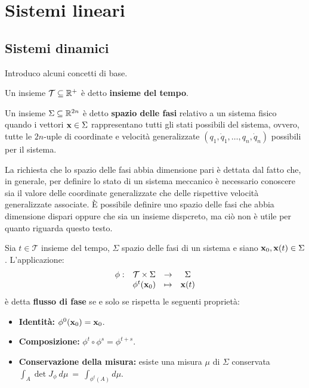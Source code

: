 \section{Sistemi lineari}

\subsection{Sistemi dinamici}
Introduco alcuni concetti di base.

\begin{definition}
    Un insieme $\mathcal T \subseteq \mathbb{R}^+$ è detto \textbf{insieme del tempo}.
\end{definition}

\begin{definition}
    Un insieme $\Sigma \subseteq \mathbb{R}^{2n}$ è detto \textbf{spazio delle fasi}
    relativo a un sistema fisico quando i vettori
    $\mathbf{x} \in \Sigma$ rappresentano tutti gli stati possibili
    del sistema, ovvero,
    tutte le $2n$-uple di coordinate e velocità generalizzate $(q_1, \dot q_1, \ldots, q_n, \dot q_n)$
    possibili per il sistema.
\end{definition}
La richiesta che lo spazio delle fasi abbia dimensione pari è dettata dal
fatto che, in generale, per definire lo stato di un sistema meccanico è
necessario conoscere sia il valore delle coordinate generalizzate
che delle rispettive velocità generalizzate associate.
È possibile definire uno spazio delle fasi che abbia dimensione dispari
oppure che sia un insieme dispcreto, ma ciò non è utile per quanto riguarda
questo testo. 

\begin{definition}
    Sia $t \in \mathcal T$ insieme del tempo, $\Sigma$ spazio delle fasi di un sistema e siano $\mathbf{x}_0, \mathbf{x}(t) \in \Sigma$.
    L'applicazione: \\
    \begin{equation*}
        \begin{array}{cccc}%
            \phi: &\mathcal T \times \Sigma &\to &\Sigma \\
            &\phi^t(\b x_0) &\mapsto &\b x(t)
        \end{array}%
    \end{equation*}
    è detta \textbf{flusso di fase} se e solo se rispetta le seguenti proprietà:
    \begin{itemize}
        \item \textbf{Identità:} $\phi^0(\mathbf{x}_0) = \mathbf{x}_0$.
        \item \textbf{Composizione:} $\phi^t \circ \phi^s = \phi^{t+s}$.
        \raggedright
        \item \textbf{Conservazione della misura:} esiste una misura $\mu$ di $\Sigma$ %
        conservata $\int_A \det J_\phi \ d\mu~=~\int_{\phi^t(A)} d\mu$.
    \end{itemize}
\end{definition}

